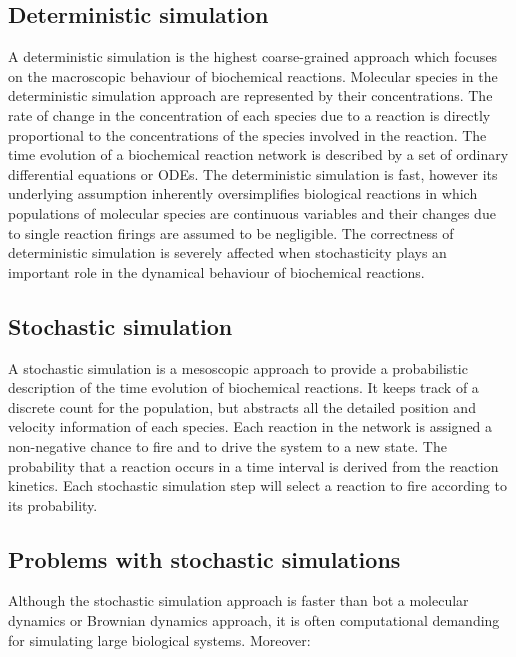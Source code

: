   \subsection{Deterministic simulation}
  A deterministic simulation is the highest coarse-grained approach which focuses on the macroscopic behaviour of biochemical reactions.
  Molecular species in the deterministic simulation approach are represented by their concentrations.
  The rate of change in the concentration of each species due to a reaction is directly proportional to the concentrations of the species involved in the reaction.
  The time evolution of a biochemical reaction network is described by a set of ordinary differential equations or ODEs.
  The deterministic simulation is fast, however its underlying assumption inherently oversimplifies biological reactions in which populations of molecular species are continuous variables and their changes due to single reaction firings are assumed to be negligible.
  The correctness of deterministic simulation is severely affected when stochasticity plays an important role in the dynamical behaviour of biochemical reactions.

  \subsection{Stochastic simulation}
  A stochastic simulation is a mesoscopic approach to provide a probabilistic description of the time evolution of biochemical reactions.
  It keeps track of a discrete count for the population, but abstracts all the detailed position and velocity information of each species.
  Each reaction in the network is assigned a non-negative chance to fire and to drive the system to a new state.
  The probability that a reaction occurs in a time interval is derived from the reaction kinetics.
  Each stochastic simulation step will select a reaction to fire according to its probability.

  \subsection{Problems with stochastic simulations}
  Although the stochastic simulation approach is faster than bot a molecular dynamics or Brownian dynamics approach, it is often computational demanding for simulating large biological systems.
  Moreover:

